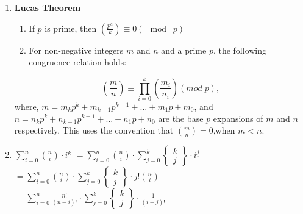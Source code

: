 \begin{enumerate}
    $$
        T(n, k)=
    \left\{\begin{aligned}
        &n! \ , n \le k\\
        &n \cdot T(n-1, k) - F(n-1, k) \cdot& T(n-k-1, k) \\ &\ \ \ \ \ \ \ \ \ \ \ \ &, n > k \\
      \end{aligned}\right.
    $$  
    Here $\displaystyle F(n, k) = n \cdot (n - 1) \cdot  \ldots  \cdot (n - k + 1)$
\item \textbf{Lucas Theorem}
    \begin{enumerate}
    \item If $\displaystyle p$ is prime, then $\displaystyle \left(\frac{p^{a}}{k}\right) \equiv 0 (\mod\; p)$  
    \item For non-negative integers $m$ and $n$ and a prime $\displaystyle p$, the following congruence relation holds:
    \end{enumerate}      
        $$\displaystyle \left(\frac{m}{n}\right) \equiv \prod_{i=0}^{k} \left(\frac{m_{i}}{n_{i}}\right) (mod\; p),$$
        where,  
        $m=m_{k} p^{k} +m_{k-1} p^{k-1}+ \ldots +m_{1} p+m_{0}$,  
        and   
        $n=n_{k}p^{k}+n_{k-1}p^{k-1}+ \ldots +n_{1}p+n_{0}$  
        are the base $\displaystyle p$ expansions of $m$ and $n$ respectively. This uses the convention that  $\displaystyle \left(\frac{m}{n}\right)=0$,when $m<n$.
\item $\displaystyle \sum_{i=0}^{n}  {\binom{n}{i}} \cdot i^{k}$  
    $= \displaystyle \sum_{i=0}^{n}  {\binom{n}{i} } \cdot \sum_{j=0}^{k}
    { \left\{ \begin{matrix} k \\ j \end{matrix} \right\} \cdot i^{\underline{j}}}$  
    $= \displaystyle \sum_{i=0}^{n} {\binom{n}{i} } \cdot \sum_{j=0}^{k} \left\{ \begin{matrix} k \\ j \end{matrix} \right\} \cdot  j! {\binom{n}{i} }$  
    $= \displaystyle \sum_{i=0}^{n} \frac{n!}{(n-i)!} \cdot \sum_{j=0}^{k} \left\{ \begin{matrix}k \\ j \end{matrix} \right\} \cdot \frac{1}{(i-j)!}$  

\end{enumerate}
